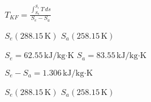 \( T_{KF} = \frac{\int_{S_a}^{S_e} T \, ds}{S_e - S_a} \)  

\( S_e (288.15 \, \text{K}) \)  
\( S_a (258.15 \, \text{K}) \)  

\( S_e = 62.55 \, \text{kJ/kg·K} \)  
\( S_a = 83.55 \, \text{kJ/kg·K} \)  

\( S_e - S_a = 1.306 \, \text{kJ/kg·K} \)  

\( S_e (288.15 \, \text{K}) \)  
\( S_a (258.15 \, \text{K}) \)